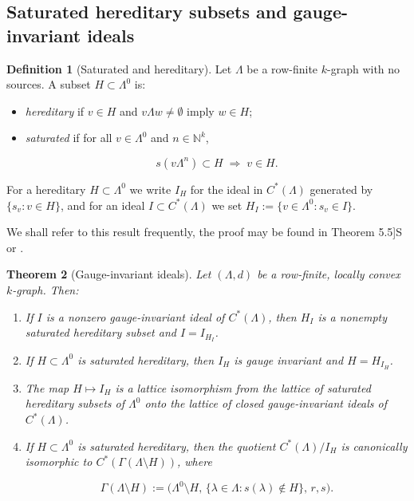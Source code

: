 \documentclass[12pt]{amsart}
\theoremstyle{plain}
\newtheorem{theorem}{Theorem}[section]
\theoremstyle{definition}
\newtheorem{definition}[theorem]{Definition}
\theoremstyle{remark}
\newcommand{\N}{\mathbb{N}}
\begin{document}
\subsection{Saturated hereditary subsets and gauge-invariant ideals}

\begin{definition}[Saturated and hereditary]\label{def:sat-her}
Let $\Lambda$ be a row-finite $k$-graph with no sources. A subset
$H\subset\Lambda^0$ is:
\begin{itemize}
\item \emph{hereditary} if $v\in H$ and $v\Lambda w\neq\emptyset$ imply $w\in H$;
\item \emph{saturated} if for all $v\in\Lambda^0$ and $n\in\N^k$,


\[
s(v\Lambda^n)\subset H \;\Rightarrow\; v\in H.
\]


\end{itemize}
\end{definition}

For a hereditary $H\subset\Lambda^0$ we write $I_H$ for the ideal in
$C^*(\Lambda)$ generated by $\{s_v : v\in H\}$, and for an ideal
$I\subset C^*(\Lambda)$ we set $H_I := \{ v\in\Lambda^0 : s_v\in I\}$.

We shall refer to this result frequently, the proof may be found in Theorem 5.5]{S} or \cite[Theorem 5.2]{RSY1}.

\begin{theorem}[Gauge-invariant ideals]\label{thm:gauge-ideals}
Let $(\Lambda,d)$ be a row-finite, locally convex $k$-graph. Then:
\begin{enumerate}
\item If $I$ is a nonzero gauge-invariant ideal of $C^*(\Lambda)$, then
      $H_I$ is a nonempty saturated hereditary subset and $I=I_{H_I}$.
\item If $H\subset\Lambda^0$ is saturated hereditary, then $I_H$ is
      gauge invariant and $H=H_{I_H}$.
\item The map $H\mapsto I_H$ is a lattice isomorphism from the lattice
      of saturated hereditary subsets of $\Lambda^0$ onto the lattice
      of closed gauge-invariant ideals of $C^*(\Lambda)$.
\item If $H\subset\Lambda^0$ is saturated hereditary, then the quotient
      $C^*(\Lambda)/I_H$ is canonically isomorphic to $C^*(\Gamma(\Lambda\setminus H))$,
      where
      

\[
      \Gamma(\Lambda\setminus H) := \big(\Lambda^0\setminus H,\,
      \{\lambda\in\Lambda : s(\lambda)\notin H\},\,r,s\big).
      \]


\end{enumerate}
\end{theorem}
\end{document}
